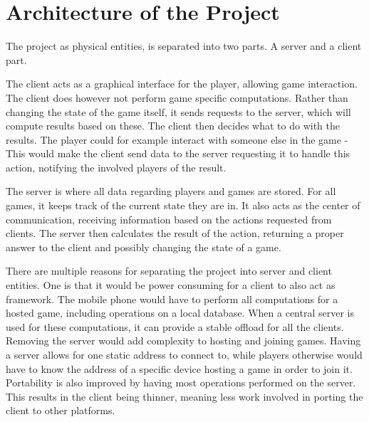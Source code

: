 \section{Architecture of the Project}
%
%

The project as physical entities, is separated into two parts. A server and a client part.

The client acts as a graphical interface for the player, allowing game interaction.
The client does however not perform game specific computations. Rather than changing the state of the game itself, it sends requests to the server, which will compute results based on these. The client then decides what to do with the results. The player could for example interact with someone else in the game - This would make the client send data to the server requesting it to handle this action, notifying the involved players of the result.

The server is where all data regarding players and games are stored. For all games, it keeps track of the current state they are in. It also acts as the center of communication, receiving information based on the actions requested from clients. The server then calculates the result of the action, returning a proper answer to the client and possibly changing the state of a game.

There are multiple reasons for separating the project into server and client entities. One is that it would be power consuming for a client to also act as framework. The mobile phone would have to perform all computations for a hosted game, including operations on a local database. When a central server is used for these computations, it can provide a stable offload for all the clients. Removing the server would add complexity to hosting and joining games. Having a server allows for one static address to connect to, while players otherwise would have to know the address of a specific device hosting a game in order to join it.
Portability is also improved by having most operations performed on the server. This results in the client being thinner, meaning less work involved in porting the client to other platforms.